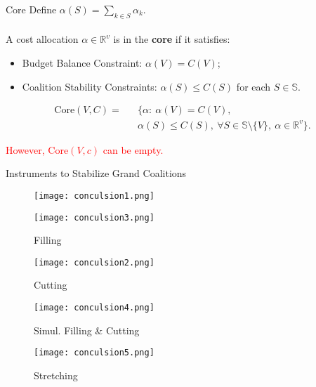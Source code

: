 \documentclass[14pt]{beamer}
\newcommand{\R}{\mathbb{R}}
\begin{document}
\begin{frame}{Core}
Define $\alpha(S)=\sum_{k\in S}\alpha_k$. \\~\\
A cost allocation $\alpha \in \R^v$ is in the \textbf{core} if it satisfies:
\begin{itemize}
\small
\justifying
	\item Budget Balance Constraint: $\alpha(V)=C(V)$;
	\item Coalition Stability Constraints: $\alpha(S)\leq C(S)$ for each  $S\in \mathbb{S}$.
\end{itemize}
\vspace{-12pt}
\begin{eqnarray*}
\mathrm{Core}(V,C) = &&\bigg\{ \alpha:~ \alpha(V)=C(V), \\
&& \alpha(S) \leq C(S), ~\forall S \in \mathbb{S} \setminus \{V\},~\alpha \in \R^v   \bigg\}.
\end{eqnarray*}

\pause
\vspace{-12pt}
\textcolor{red}{However, $\mathrm{Core}(V,c)$ can be empty.}
\end{frame}


\begin{frame}{Instruments to Stabilize Grand Coalitions}
\begin{figure}[H]
\centering
\begin{minipage}[t]{0.32\textwidth}
\centering
\texttt{[image: conculsion1.png]}
\end{minipage}
\begin{minipage}[t]{0.32\textwidth}
\centering
\texttt{[image: conculsion3.png]}
\caption*{Filling}
\end{minipage}
\begin{minipage}[t]{0.32\textwidth}
\centering
\texttt{[image: conculsion2.png]}
\caption*{Cutting}
\end{minipage}
\end{figure}
\begin{figure}[H]
\centering
\begin{minipage}[t]{0.49\textwidth}
\centering
\texttt{[image: conculsion4.png]}
\caption*{Simul. Filling \& Cutting}
\end{minipage}
\begin{minipage}[t]{0.49\textwidth}
\centering
\texttt{[image: conculsion5.png]}
\caption*{Stretching}
\end{minipage}
\end{figure}
\end{frame}
\end{document}
